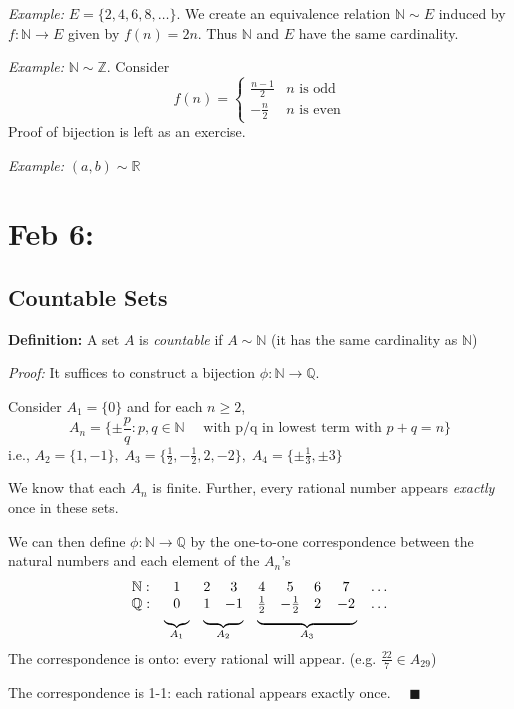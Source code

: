 \documentclass[12pt]{report}
\newcommand{\R}{\mathbb{R}}
\newcommand{\Z}{\mathbb{Z}}
\newcommand{\Q}{\mathbb{Q}}
\newcommand{\N}{\mathbb{N}}
\newcommand{\qed}{\quad \blacksquare}
\newenvironment*{tbox}[2][gray]{
    \begin{tcolorbox}[
        parbox=false,
        colback=#1!5!white,
        colframe=#1!75!black,
        breakable,
        title={#2}
    ]}
    {\end{tcolorbox}}
\begin{document}
        \emph{Example:} $E = \{2, 4, 6, 8, \dots\}$. We create an equivalence relation $\N \sim E$ induced by $f: \N \to E$ given by $f(n) = 2n$. Thus $\N$ and $E$ have the same cardinality.

        \emph{Example:} $\N \sim \Z$. Consider
        \[f(n) = \begin{cases}
            \frac{n-1}{2} &n \text{ is odd}\\
            -\frac{n}{2} &n \text{ is even}
        \end{cases}\]
        Proof of bijection is left as an exercise.

        \emph{Example:} $(a, b) \sim \R$ 

\section{Feb 6:}
    \subsection*{Countable Sets}
        \textbf{Definition:} A set $A$ is \emph{countable} if $A \sim \N$ (it has the same cardinality as $\N$)

        \begin{tbox}{\textbf{Theorem:} $\Q$ is countable}
            \emph{Proof:} 
                It suffices to construct a bijection $\phi: \N \to \Q$. 

                Consider $A_1 =\{0\}$ and for each $n \geq 2$,
                \[A_n = \{\pm \frac{p}{q}: p, q \in \N \quad \text{ with p/q in lowest term with } p + q = n\}\]
                i.e., $A_2 = \{1, -1\}, \; A_3 = \{\frac{1}{2}, -\frac{1}{2}, 2, -2\}, \; A_4 = \{\pm \frac{1}{3}, \pm 3\}$

                We know that each $A_n$ is finite. Further, every rational number appears \emph{exactly} once in these sets. 

                We can then define $\phi: \N \to \Q$ by the one-to-one correspondence between the natural numbers and each element of the $A_n$'s
                \[\begin{array}{ccccccccc}
                    \N: & 1 & 2 & 3 & 4 & 5 & 6 & 7 & \dots\\ 
                    \Q: & 0 & 1 & -1 & \frac{1}{2} & -\frac{1}{2} & 2 & -2 & \dots\\[-4pt]
                        & \multicolumn{1}{c}{\underbrace{\rule{0.25cm}{0pt}}_{A_1}} & \multicolumn{2}{c}{\underbrace{\rule{1cm}{0pt}}_{A_2}} & \multicolumn{4}{c}{\underbrace{\rule{2.5cm}{0pt}}_{A_3}} &            
                \end{array}\]
                The correspondence is onto: every rational will appear. (e.g. $\frac{22}{7}\in A_{29}$) 

                The correspondence is 1-1: each rational appears exactly once. $\qed$
        \end{tbox}
\end{document}
